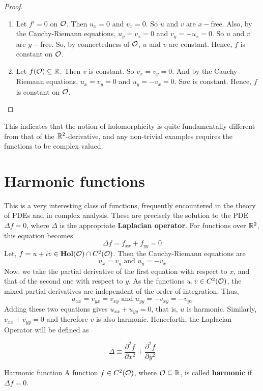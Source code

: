 \documentclass[../ComplexAnalysis_Notes.tex]{subfiles}
\begin{document}
\begin{proof}
  \begin{enumerate}
    \item Let \(f' = 0\) on \(\mathcal{O}\). Then \(u_x = 0\) and \(v_x = 0\). So \(u\) and \(v\) are \(x-\)free. Also, by the Cauchy-Riemann equations, \(u_y = v_x = 0\) and \(v_y = -u_x = 0\). So \(u\) and \(v\) are \(y-\)free. So, by connectedness of \(\mathcal{O}\), \(u\) and \(v\) are constant. Hence, \(f\) is constant on \(\mathcal{O}\).
    \item Let \(f(\mathcal{O}) \subseteq \mathbb{R}\). Then \(v\) is constant. So \(v_x = v_y = 0\). And by the Cauchy-Riemann equations, \(u_x = v_y = 0\) and \(u_y = -v_x = 0\). So\(u\) is constant. Hence, \(f\) is constant on \(\mathcal{O}\).
  \end{enumerate}
\end{proof}

This indicates that the notion of holomorphicity is quite fundamentally different from that of the $\mathbb{R}^2$-derivative, and any non-trivial examples requires the functions to be complex valued.

\section{Harmonic functions}
This is a very interesting class of functions, frequently encountered in the theory of PDEs and in complex analysis. These are precisely the solution to the PDE $\Delta f = 0$, where $\Delta$ is the appropriate \textbf{Laplacian operator}. For functions over $\mathbb{R}^2$, this equation becomes
\[\Delta f = f_{xx} + f_{yy} = 0\]
Let, \(f = u + iv \in \operatorname{\mathbf{Hol}}(\mathcal{O}) \cap C^2(\mathcal{O})\). Then the Cauchy-Riemann equations are
\[ u_x = v_y \text{ and } u_y = -v_x \]
Now, we take the partial derivative of the first equation with respect to $x$, and that of the second one with respect to \(y\). As the functions $u, v \in C^2(\mathcal{O})$, the mixed partial derivatives are independent of the order of integration. Thus,
\[ u_{xx} = v_{yx} = v_{xy} \text{ and } u_{yy} = -v_{xy} = -v_{yx} \]
Adding these two equations gives \(u_{xx} + u_{yy} = 0\), that is, \(u\) is harmonic. Similarly, \(v_{xx} + v_{yy} = 0\) and therefore \(v\) is also harmonic. Henceforth, the Laplacian Operator will be defined as

\[\Delta \equiv \frac{\partial^2 f}{\partial x^2} + \frac{\partial^2 f}{\partial y^2}\]

\begin{Def}{Harmonic function}{}
  A function \(f \in C^2(\mathcal{O})\), where \(\mathcal{O} \subseteq \mathbb{R}\), is called \textbf{harmonic} if \(\Delta f = 0\).
\end{Def}
\end{document}
